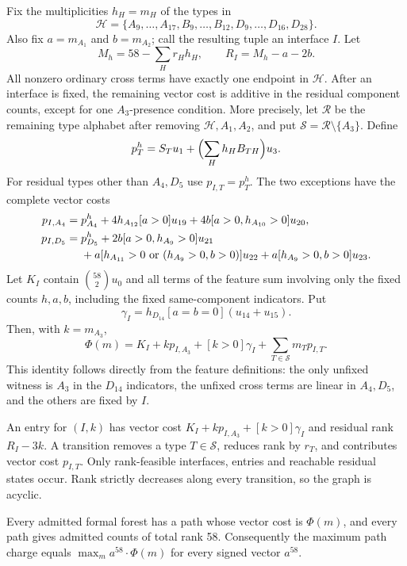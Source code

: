Fix the multiplicities $h_H=m_H$ of the types in
\begin{equation}\label{fv:high-set}
 \mathcal H=\{A_9,\ldots,A_{17},B_9,\ldots,B_{12},
                    D_9,\ldots,D_{16},D_{28}\}.
\end{equation}
Also fix $a=m_{A_1}$ and $b=m_{A_2}$; call the resulting tuple an
interface $I$. Let
\[
 M_h=58-\sum_Hr_Hh_H,\qquad R_I=M_h-a-2b.
\]
All nonzero ordinary cross terms have exactly one endpoint in
$\mathcal H$. After an interface is fixed, the remaining vector cost
is additive in the residual component counts, except for one
$A_3$-presence condition. More precisely, let $\mathcal R$ be the
remaining type alphabet after removing $\mathcal H,A_1,A_2$, and put
$\mathcal S=\mathcal R\setminus\{A_3\}$. Define
\[
 p_T^h=S_Tu_1+\Bigl(\sum_Hh_HB_{TH}\Bigr)u_3.
\]
For residual types other than $A_4,D_5$ use $p_{I,T}=p_T^h$.
The two exceptions have the complete vector costs
\begin{align}
 p_{I,A_4}={}&p_{A_4}^h+4h_{A_{12}}[a>0]u_{19}
                    +4b[a>0,h_{A_{10}}>0]u_{20},\notag\\
 p_{I,D_5}={}&p_{D_5}^h+2b[a>0,h_{A_9}>0]u_{21}\notag\\
 &+a[h_{A_{11}}>0\text{ or }(h_{A_9}>0,b>0)]u_{22}
                    +a[h_{A_9}>0,b>0]u_{23}.
                    \label{fv:residual-costs}
\end{align}
Let $K_I$ contain $\binom{58}{2}u_0$ and all terms of the feature
sum involving only the fixed counts $h,a,b$, including the fixed
same-component indicators. Put
\[
              \gamma_I=h_{D_{14}}[a=b=0](u_{14}+u_{15}).
\]
Then, with $k=m_{A_3}$,
\begin{equation}\label{fv:vector-cost-identity}
 \Phi(m)=K_I+kp_{I,A_3}+[k>0]\gamma_I
                         +\sum_{T\in\mathcal S}m_Tp_{I,T}.
\end{equation}
This identity follows directly from the feature definitions: the only
unfixed witness is $A_3$ in the $D_{14}$ indicators, the unfixed cross
terms are linear in $A_4,D_5$, and the others are fixed by $I$.

An entry for $(I,k)$ has vector cost
$K_I+kp_{I,A_3}+[k>0]\gamma_I$ and residual rank $R_I-3k$.
A transition removes a type $T\in\mathcal S$, reduces rank by
$r_T$, and contributes vector cost $p_{I,T}$. Only rank-feasible
interfaces, entries and reachable residual states occur. Rank strictly
decreases along every transition, so the graph is acyclic.

\begin{lemma}\label{fv:network-exact}
Every admitted formal forest has a path whose vector cost is
$\Phi(m)$, and every path gives admitted counts of total rank 58.
Consequently the maximum path charge equals
$\max_m a^{58}\cdot\Phi(m)$ for every signed vector $a^{58}$.
\end{lemma}

